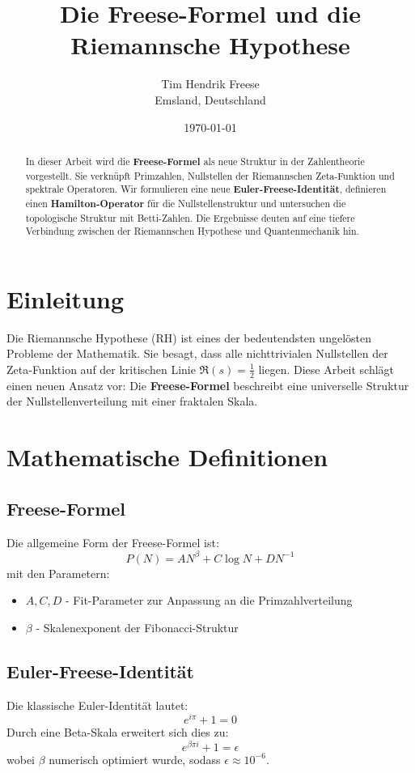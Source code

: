 \documentclass[a4paper,12pt]{article}
\title{Die Freese-Formel und die Riemannsche Hypothese}
\author{Tim Hendrik Freese \\ \small Emsland, Deutschland}
\date{\today}
\begin{document}
\maketitle
\begin{abstract}
    In dieser Arbeit wird die \textbf{Freese-Formel} als neue Struktur in der Zahlentheorie vorgestellt. 
    Sie verknüpft Primzahlen, Nullstellen der Riemannschen Zeta-Funktion und spektrale Operatoren.
    Wir formulieren eine neue \textbf{Euler-Freese-Identität}, definieren einen \textbf{Hamilton-Operator}
    für die Nullstellenstruktur und untersuchen die topologische Struktur mit Betti-Zahlen.
    Die Ergebnisse deuten auf eine tiefere Verbindung zwischen der Riemannschen Hypothese und
    Quantenmechanik hin.
\end{abstract}

\tableofcontents

\section{Einleitung}
Die Riemannsche Hypothese (RH) ist eines der bedeutendsten ungelösten Probleme der Mathematik.
Sie besagt, dass alle nichttrivialen Nullstellen der Zeta-Funktion auf der kritischen Linie $\Re(s) = \frac{1}{2}$ liegen.
Diese Arbeit schlägt einen neuen Ansatz vor: Die \textbf{Freese-Formel} beschreibt eine universelle 
Struktur der Nullstellenverteilung mit einer fraktalen Skala.

\section{Mathematische Definitionen}
\subsection{Freese-Formel}
Die allgemeine Form der Freese-Formel ist:
\begin{equation}
    P(N) = A N^\beta + C \log N + D N^{-1}
\end{equation}
mit den Parametern:
\begin{itemize}
    \item $A, C, D$ - Fit-Parameter zur Anpassung an die Primzahlverteilung
    \item $\beta$ - Skalenexponent der Fibonacci-Struktur
\end{itemize}

\subsection{Euler-Freese-Identität}
Die klassische Euler-Identität lautet:
\begin{equation}
    e^{i\pi} + 1 = 0
\end{equation}
Durch eine Beta-Skala erweitert sich dies zu:
\begin{equation}
    e^{\beta \pi i} + 1 = \epsilon
\end{equation}
wobei $\beta$ numerisch optimiert wurde, sodass $\epsilon \approx 10^{-6}$.
\end{document}
